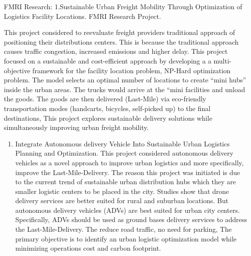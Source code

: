 \documentclass[
]{book}
\providecommand{\tightlist}{%
  \setlength{\itemsep}{0pt}\setlength{\parskip}{0pt}}
\begin{document}
FMRI Research:
1.Sustainable Urban Freight Mobility Through Optimization of Logistics Facility Locations. FMRI Research Project.

This project considered to reevaluate freight providers traditional approach of positioning their distributions centers.
This is because the traditional approach causes traffic congestion, increased emissions and higher delay.
This project focused on a sustainable and cost-efficient approach by developing a a multi-objective framework for the facility location problem, NP-Hard optimization problem.
The model selects an optimal number of locations to create ``mini hubs'' inside the urban areas.
The trucks would arrive at the ``mini facilities and unload the goods.
The goods are then delivered (Last-Mile) via eco-friendly transportation modes (handcarts, bicycles, self-picked up) to the final destinations,
This project explores sustainable delivery solutions while simultaneously improving urban freight mobility.

\begin{enumerate}
\def\labelenumi{\arabic{enumi}.}
\setcounter{enumi}{1}
\tightlist
\item
  Integrate Autonomous delivery Vehicle Into Sustainable Urban Logistics Planning and Optimization.
  This project considered autonomous delivery vehicles as a novel approach to improve urban logistics and more specifically, improve the Last-Mile-Delivery.
  The reason this project was initiated is due to the current trend of sustainable urban distribution hubs which they are smaller logistic centers to be placed in the city.
  Studies show that drone delivery services are better suited for rural and suburban locations.
  But autonomous delivery vehicles (ADVs) are best suited for urban city centers.
  Specifically, ADVs should be used as ground bases delivery services to address the Last-Mile-Delivery.
  The reduce road traffic, no need for parking,
  The primary objective is to identify an urban logistic optimization model while minimizing operations cost and carbon footprint.
\end{enumerate}
\end{document}
